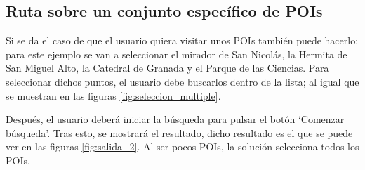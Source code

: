\subsection[Caso 2]{Ruta sobre un conjunto específico de POIs}
Si se da el caso de que el usuario quiera visitar unos POIs también puede hacerlo; para este ejemplo se van a seleccionar el mirador de San Nicolás, la Hermita de San Miguel Alto, la Catedral de Granada y el Parque de las Ciencias. Para seleccionar dichos puntos, el usuario debe buscarlos dentro de la lista; al igual que se muestran en las figuras \ref{fig:seleccion_multiple}.\newline

Después, el usuario deberá iniciar la búsqueda para pulsar el botón \enquote*{Comenzar búsqueda}. Tras esto, se mostrará el resultado, dicho resultado es el que se puede ver en las figuras \ref{fig:salida_2}. Al ser pocos POIs, la solución selecciona todos los POIs.\newline

